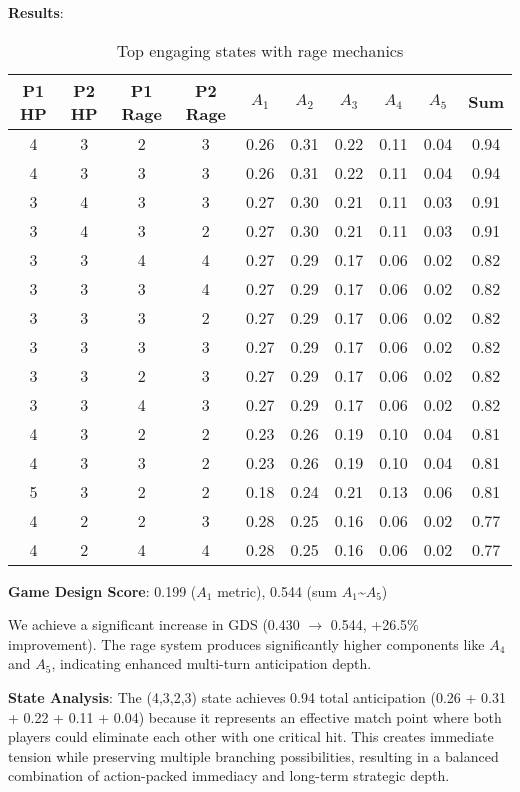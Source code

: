 \documentclass{article}
\begin{document}
\textbf{Results}:
\begin{table}[H]
\centering
\begin{tabular}{|c|c|c|c|c|c|c|c|c|c|}
\hline
P1 HP & P2 HP & P1 Rage & P2 Rage & $A_1$ & $A_2$ & $A_3$ & $A_4$ & $A_5$ & Sum \\
\hline
4 & 3 & 2 & 3 & 0.26 & 0.31 & 0.22 & 0.11 & 0.04 & 0.94 \\
4 & 3 & 3 & 3 & 0.26 & 0.31 & 0.22 & 0.11 & 0.04 & 0.94 \\
3 & 4 & 3 & 3 & 0.27 & 0.30 & 0.21 & 0.11 & 0.03 & 0.91 \\
3 & 4 & 3 & 2 & 0.27 & 0.30 & 0.21 & 0.11 & 0.03 & 0.91 \\
3 & 3 & 4 & 4 & 0.27 & 0.29 & 0.17 & 0.06 & 0.02 & 0.82 \\
3 & 3 & 3 & 4 & 0.27 & 0.29 & 0.17 & 0.06 & 0.02 & 0.82 \\
3 & 3 & 3 & 2 & 0.27 & 0.29 & 0.17 & 0.06 & 0.02 & 0.82 \\
3 & 3 & 3 & 3 & 0.27 & 0.29 & 0.17 & 0.06 & 0.02 & 0.82 \\
3 & 3 & 2 & 3 & 0.27 & 0.29 & 0.17 & 0.06 & 0.02 & 0.82 \\
3 & 3 & 4 & 3 & 0.27 & 0.29 & 0.17 & 0.06 & 0.02 & 0.82 \\
4 & 3 & 2 & 2 & 0.23 & 0.26 & 0.19 & 0.10 & 0.04 & 0.81 \\
4 & 3 & 3 & 2 & 0.23 & 0.26 & 0.19 & 0.10 & 0.04 & 0.81 \\
5 & 3 & 2 & 2 & 0.18 & 0.24 & 0.21 & 0.13 & 0.06 & 0.81 \\
4 & 2 & 2 & 3 & 0.28 & 0.25 & 0.16 & 0.06 & 0.02 & 0.77 \\
4 & 2 & 4 & 4 & 0.28 & 0.25 & 0.16 & 0.06 & 0.02 & 0.77 \\
\hline
\end{tabular}
\caption{Top engaging states with rage mechanics}
\end{table}

\textbf{Game Design Score}: 0.199 ($A_1$ metric), 0.544 (sum $A_1$\textasciitilde$A_5$)

We achieve a significant increase in GDS (0.430 $\rightarrow$ 0.544, +26.5\% improvement). The rage system produces significantly higher components like $A_4$ and $A_5$, indicating enhanced multi-turn anticipation depth.

\textbf{State Analysis}: The (4,3,2,3) state achieves 0.94 total anticipation (0.26 + 0.31 + 0.22 + 0.11 + 0.04) because it represents an effective match point where both players could eliminate each other with one critical hit. This creates immediate tension while preserving multiple branching possibilities, resulting in a balanced combination of action-packed immediacy and long-term strategic depth.
\end{document}
